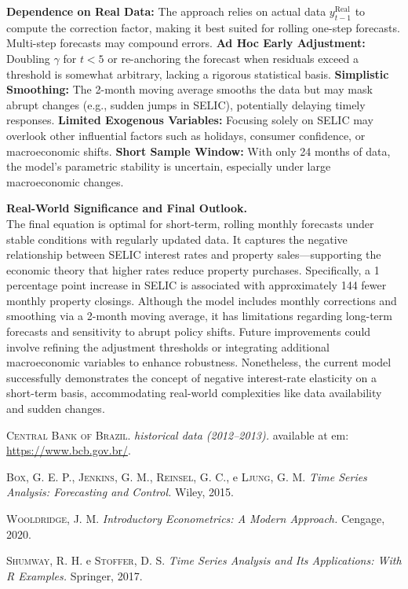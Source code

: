 \documentclass{article}
\begin{document}
    \textbf{Dependence on Real Data:} The approach relies on actual data \(y_{t-1}^\mathrm{Real}\) to compute the correction factor, making it best suited for rolling one-step forecasts. Multi-step forecasts may compound errors.
    \textbf{Ad Hoc Early Adjustment:} Doubling \(\gamma\) for \(t<5\) or re-anchoring the forecast when residuals exceed a threshold is somewhat arbitrary, lacking a rigorous statistical basis.
    \textbf{Simplistic Smoothing:} The 2-month moving average smooths the data but may mask abrupt changes (e.g., sudden jumps in SELIC), potentially delaying timely responses.
    \textbf{Limited Exogenous Variables:} Focusing solely on SELIC may overlook other influential factors such as holidays, consumer confidence, or macroeconomic shifts.
    \textbf{Short Sample Window:} With only 24 months of data, the model's parametric stability is uncertain, especially under large macroeconomic changes.


\textbf{Real-World Significance and Final Outlook.}\\[1mm]
The final equation is optimal for short-term, rolling monthly forecasts under stable conditions with regularly updated data. It captures the negative relationship between SELIC interest rates and property sales—supporting the economic theory that higher rates reduce property purchases. Specifically, a 1 percentage point increase in SELIC is associated with approximately 144 fewer monthly property closings. Although the model includes monthly corrections and smoothing via a 2-month moving average, it has limitations regarding long-term forecasts and sensitivity to abrupt policy shifts. Future improvements could involve refining the adjustment thresholds or integrating additional macroeconomic variables to enhance robustness. Nonetheless, the current model successfully demonstrates the concept of negative interest-rate elasticity on a short-term basis, accommodating real-world complexities like data availability and sudden changes.

\clearpage

\begin{thebibliography}{99}

\textsc{Central Bank of Brazil.}
\emph{historical data (2012--2013).}
available at em: \url{https://www.bcb.gov.br/}.

\textsc{Box, G. E. P.}, \textsc{Jenkins, G. M.}, \textsc{Reinsel, G. C.}, e \textsc{Ljung, G. M.}
\emph{Time Series Analysis: Forecasting and Control.}
Wiley, 2015.

\textsc{Wooldridge, J. M.}
\emph{Introductory Econometrics: A Modern Approach.}
Cengage, 2020.

\textsc{Shumway, R. H.} e \textsc{Stoffer, D. S.}
\emph{Time Series Analysis and Its Applications: With R Examples.}
Springer, 2017.

\end{thebibliography}
\end{document}
